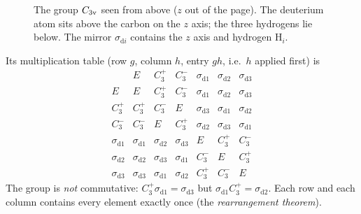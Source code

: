 \begin{figure}[ht]
\centering
{}
\caption{The group $C_{3\mathrm{v}}$ seen from above ($z$ out of the page). The deuterium
atom sits above the carbon on the $z$ axis; the three hydrogens lie below. The
mirror $\sigma_{\mathrm{d}i}$ contains the $z$ axis and hydrogen H$_i$.}
\label{fig:c3v}
\end{figure}

Its multiplication table (row $g$, column $h$, entry $g h$, i.e.\ $h$ applied first)
is
\begin{equation}\label{eq:c3vtable}
\begin{array}{c|cccccc}
 & E & C_3^+ & C_3^- & \sigma_{\mathrm{d}1} & \sigma_{\mathrm{d}2} & \sigma_{\mathrm{d}3}\\\hline
E & E & C_3^+ & C_3^- & \sigma_{\mathrm{d}1} & \sigma_{\mathrm{d}2} & \sigma_{\mathrm{d}3}\\
C_3^+ & C_3^+ & C_3^- & E & \sigma_{\mathrm{d}3} & \sigma_{\mathrm{d}1} & \sigma_{\mathrm{d}2}\\
C_3^- & C_3^- & E & C_3^+ & \sigma_{\mathrm{d}2} & \sigma_{\mathrm{d}3} & \sigma_{\mathrm{d}1}\\
\sigma_{\mathrm{d}1} & \sigma_{\mathrm{d}1} & \sigma_{\mathrm{d}2} & \sigma_{\mathrm{d}3} & E & C_3^+ & C_3^-\\
\sigma_{\mathrm{d}2} & \sigma_{\mathrm{d}2} & \sigma_{\mathrm{d}3} & \sigma_{\mathrm{d}1} & C_3^- & E & C_3^+\\
\sigma_{\mathrm{d}3} & \sigma_{\mathrm{d}3} & \sigma_{\mathrm{d}1} & \sigma_{\mathrm{d}2} & C_3^+ & C_3^- & E
\end{array}
\end{equation}
The group is \emph{not} commutative: $C_3^+\sigma_{\mathrm{d}1}=\sigma_{\mathrm{d}3}$
but $\sigma_{\mathrm{d}1}C_3^+=\sigma_{\mathrm{d}2}$. Each row and each column
contains every element exactly once (the \emph{rearrangement theorem}).

